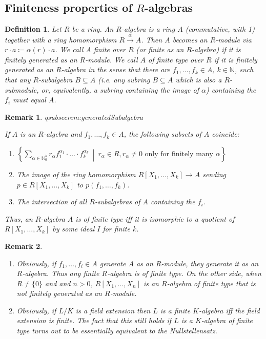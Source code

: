 \documentclass[DIV=14,parskip=full,pointednumbers]{scrartcl}
\newenvironment{alphanumerate}{\begin{enumerate}[label={$(\alph*)$},ref=\curthm]}{\end{enumerate}}
\renewenvironment{itemize}{\begin{enumerate}[label={$\bullet$},ref=\curthm]}{\end{enumerate}}
\theoremstyle{cthm}
\theoremstyle{cvarthm}
\theoremstyle{cdef}
\newtheorem{defi}{Definition}[subsection]
\newtheorem{rem}{Remark}[subsection]
\newcommand{\lbl}[1]{
	\label{#1}
	\ifmmode
	\expandafter\xdef\csname eqsubsec#1\endcsname{\thesubsection}
	\fi
}
\newcommand{\IN}{\mathbb{N}}
\newcommand{\longto}{\longrightarrow}
\newcommand{\st}{\ \middle|\ }
\begin{document}
	\subsection{Finiteness properties of \texorpdfstring{$R$}{R}-algebras}
	\begin{defi}
		Let $R$ be a ring. An \emph{$R$-algebra} is a ring $A$ (commutative, with 1) together with a ring homomorphism $R\overset{\alpha}{\longto} A$. Then $A$ becomes an $R$-module via $r\cdot a \coloneqq \alpha(r) \cdot a$. We call $A$ \emph{finite over $R$} (or \emph{finite as an $R$-algebra}) if it is finitely generated as an $R$-module. We call $A$ of \emph{finite type over $R$} if it is finitely generated as an $R$-algebra in the sense that there are $f_1,\ldots, f_k\in A$, $k\in \IN$, such that any $R$-subalgebra $B\subseteq A$ (i.e. any subring $B\subseteq A$ which is also a $R$-submodule, or, equivalently, a subring containing the image of $\alpha$) containing the $f_i$ must equal $A$.
	\end{defi}
	\begin{rem}\lbl{rem:generatedSubalgebra}
		If $A$ is an $R$-algebra and $f_1,\ldots,f_k\in A$, the following subsets of $A$ coincide:
		\begin{itemize}
			\item $\left\{\sum_{\alpha\in\IN_0^k} r_\alpha f_1^{\alpha_1}\cdot\ldots\cdot f_k^{\alpha_k}\st r_\alpha\in R, r_\alpha\neq 0 \text{ only for finitely many } \alpha\right\}$
			\item The image of the ring homomorphism $R[X_1,\ldots,X_k]\to A$ sending $p\in R[X_1,\ldots, X_k]$ to $p(f_1,\ldots,f_k)$.
			\item The intersection of all $R$-subalgebras of $A$ containing the $f_i$.
		\end{itemize}
		Thus, an $R$-algebra $A$ is of finite type iff it is isomorphic to a quotient of $R[X_1,\ldots, X_k]$ by some ideal $I$ for finite $k$.
	\end{rem}
	\begin{rem}
		\begin{alphanumerate}
			\item Obviously, if $f_1,\ldots, f_i\in A$ generate $A$ as an $R$-module, they generate it as an $R$-algebra. Thus any finite $R$-algebra is of finite type. On the other side, when $R\neq \{0\}$ and and $n>0$, $R[X_1, \ldots, X_n]$ is an $R$-algebra of finite type that is not finitely generated as an $R$-module.
			\item Obviously, if $L/K$ is a field extension then $L$ is a finite $K$-algebra iff the field extension is finite. The fact that this still holds if $L$ is a $K$-algebra of finite type turns out to be essentially equivalent to the Nullstellensatz.
		\end{alphanumerate}
		
	\end{rem}
	
\end{document}
